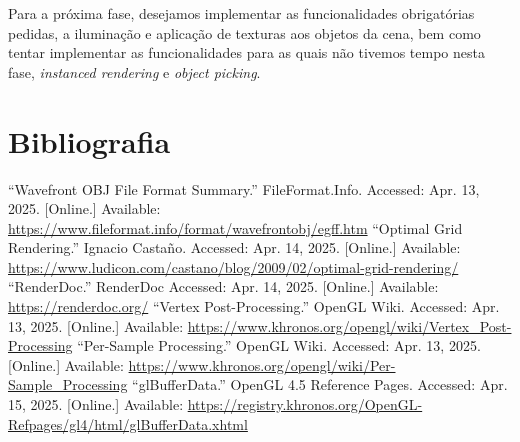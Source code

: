 \documentclass[12pt, a4paper]{article}
\begin{document}
Para a próxima fase, desejamos implementar as funcionalidades obrigatórias pedidas, a iluminação e
aplicação de texturas aos objetos da cena, bem como tentar implementar as funcionalidades para as
quais não tivemos tempo nesta fase, \emph{instanced rendering} e \emph{object picking}.

\begingroup
\section{Bibliografia}
\renewcommand{\section}[2]{}

\begin{thebibliography}{9}
        ``Wavefront OBJ File Format Summary.'' FileFormat.Info. Accessed: Apr. 13, 2025. [Online.]
        Available: \url{https://www.fileformat.info/format/wavefrontobj/egff.htm}
        ``Optimal Grid Rendering.'' Ignacio Castaño. Accessed: Apr. 14, 2025. [Online.] Available:
        \url{https://www.ludicon.com/castano/blog/2009/02/optimal-grid-rendering/}
        ``RenderDoc.'' RenderDoc Accessed: Apr. 14, 2025. [Online.] Available:
        \url{https://renderdoc.org/}
        ``Vertex Post-Processing.'' OpenGL Wiki. Accessed: Apr. 13, 2025. [Online.] Available:
        \url{https://www.khronos.org/opengl/wiki/Vertex_Post-Processing}
        ``Per-Sample Processing.'' OpenGL Wiki. Accessed: Apr. 13, 2025. [Online.] Available:
        \url{https://www.khronos.org/opengl/wiki/Per-Sample_Processing}
        ``glBufferData.'' OpenGL 4.5 Reference Pages. Accessed: Apr. 15, 2025. [Online.] Available:
        \url{https://registry.khronos.org/OpenGL-Refpages/gl4/html/glBufferData.xhtml}
\end{thebibliography}
\endgroup
\end{document}

